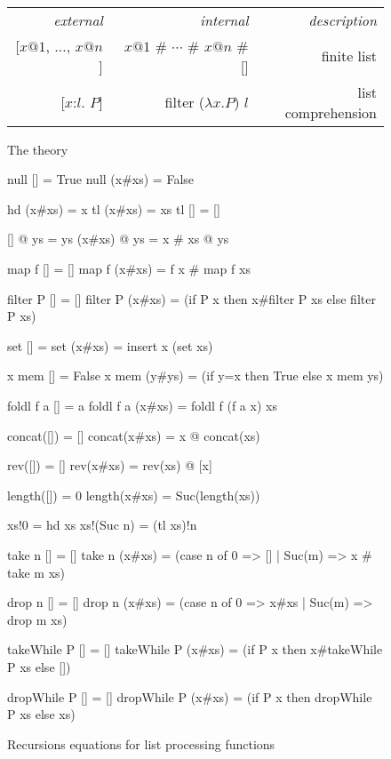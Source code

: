 \begin{figure}
\begin{center} \tt\frenchspacing
\begin{tabular}{rrr} 
  \it external        & \it internal  & \it description \\{}
  [$x@1$, $\dots$, $x@n$]  &  $x@1$ \# $\cdots$ \# $x@n$ \# [] &
        \rm finite list \\{}
  [$x$:$l$. $P$]  & filter ($\lambda x{.}P$) $l$ & 
        \rm list comprehension
\end{tabular}
\end{center}
\caption{The theory } \label{hol-list}
\end{figure}


\begin{figure}
\begin{ttbox}\makeatother
null [] = True
null (x#xs) = False

hd (x#xs) = x
tl (x#xs) = xs
tl [] = []

[] @ ys = ys
(x#xs) @ ys = x # xs @ ys

map f [] = []
map f (x#xs) = f x # map f xs

filter P [] = []
filter P (x#xs) = (if P x then x#filter P xs else filter P xs)

set [] = \ttlbrace\ttrbrace
set (x#xs) = insert x (set xs)

x mem [] = False
x mem (y#ys) = (if y=x then True else x mem ys)

foldl f a [] = a
foldl f a (x#xs) = foldl f (f a x) xs

concat([]) = []
concat(x#xs) = x @ concat(xs)

rev([]) = []
rev(x#xs) = rev(xs) @ [x]

length([]) = 0
length(x#xs) = Suc(length(xs))

xs!0 = hd xs
xs!(Suc n) = (tl xs)!n

take n [] = []
take n (x#xs) = (case n of 0 => [] | Suc(m) => x # take m xs)

drop n [] = []
drop n (x#xs) = (case n of 0 => x#xs | Suc(m) => drop m xs)

takeWhile P [] = []
takeWhile P (x#xs) = (if P x then x#takeWhile P xs else [])

dropWhile P [] = []
dropWhile P (x#xs) = (if P x then dropWhile P xs else xs)
\end{ttbox}
\caption{Recursions equations for list processing functions}
\label{fig:HOL:list-simps}
\end{figure}


